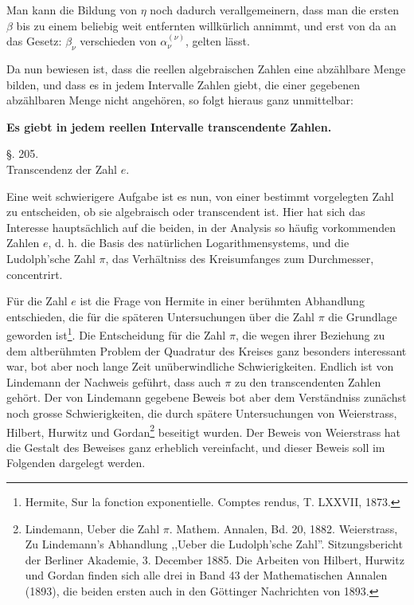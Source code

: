 \documentclass[11pt]{article}
\begin{document}
Man kann die Bildung von $\eta$ noch dadurch verallgemeinern, dass man die ersten $\beta$ bis zu einem beliebig weit entfernten willkürlich annimmt, und erst von da an das Gesetz: $\beta_\nu$ verschieden von $\alpha_\nu^{(\nu)}$, gelten lässt.

Da nun bewiesen ist, dass die reellen algebraischen Zahlen eine abzählbare Menge bilden, und dass es in jedem Intervalle Zahlen giebt, die einer gegebenen abzählbaren Menge nicht angehören, so folgt hieraus ganz unmittelbar:

\begin{center}
\textbf{Es giebt in jedem reellen Intervalle transcendente Zahlen.}
\end{center}

\begin{center}
{\large §. 205.}\\[0.4em]
{\large Transcendenz der Zahl $e$.}
\end{center}

Eine weit schwierigere Aufgabe ist es nun, von einer bestimmt vorgelegten Zahl zu entscheiden, ob sie algebraisch oder transcendent ist. Hier hat sich das Interesse hauptsächlich auf die beiden, in der Analysis so häufig vorkommenden Zahlen $e$, d. h. die Basis des natürlichen Logarithmensystems, und die Ludolph'sche Zahl $\pi$, das Verhältniss des Kreisumfanges zum Durchmesser, concentrirt.

Für die Zahl $e$ ist die Frage von Hermite in einer berühmten Abhandlung entschieden, die für die späteren Untersuchungen über die Zahl $\pi$ die Grundlage geworden ist\footnote{Hermite, Sur la fonction exponentielle. Comptes rendus, T. LXXVII, 1873.}. Die Entscheidung für die Zahl $\pi$, die wegen ihrer Beziehung zu dem altberühmten Problem der Quadratur des Kreises ganz besonders interessant war, bot aber noch lange Zeit unüberwindliche Schwierigkeiten. Endlich ist von Lindemann der Nachweis geführt, dass auch $\pi$ zu den transcendenten Zahlen gehört. Der von Lindemann gegebene Beweis bot aber dem Verständniss zunächst noch grosse Schwierigkeiten, die durch spätere Untersuchungen von Weierstrass, Hilbert, Hurwitz und Gordan\footnote{Lindemann, Ueber die Zahl $\pi$. Mathem. Annalen, Bd. 20, 1882. Weierstrass, Zu Lindemann's Abhandlung ,,Ueber die Ludolph'sche Zahl''. Sitzungsbericht der Berliner Akademie, 3. December 1885. Die Arbeiten von Hilbert, Hurwitz und Gordan finden sich alle drei in Band 43 der Mathematischen Annalen (1893), die beiden ersten auch in den Göttinger Nachrichten von 1893.}
beseitigt wurden. Der Beweis von Weierstrass hat die Gestalt des Beweises ganz erheblich vereinfacht, und dieser Beweis soll im Folgenden dargelegt werden.
\end{document}
